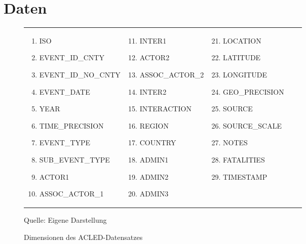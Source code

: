 \documentclass[usegeometry=true]{scrartcl}
\begin{document}
\section{Daten} \label{sec:daten}

\begin{figure}[]
\begin{center}

\begin{tabular}{lllll}
 \parbox{5.5cm}{
 \begin{enumerate}
  \item ISO
  \item EVENT\_ID\_CNTY
  \item EVENT\_ID\_NO\_CNTY
  \item EVENT\_DATE
  \item YEAR
  \item TIME\_PRECISION
  \item EVENT\_TYPE
  \item SUB\_EVENT\_TYPE
  \item ACTOR1
  \item ASSOC\_ACTOR\_1
 \end{enumerate}}
 &
 \parbox{4.5cm}{
 \begin{enumerate}
 \setcounter{enumi}{10}
  \item INTER1
  \item ACTOR2
  \item ASSOC\_ACTOR\_2
  \item INTER2
  \item INTERACTION
  \item REGION
  \item COUNTRY
  \item ADMIN1
  \item ADMIN2
  \item ADMIN3
 \end{enumerate}}
 &
 \parbox{5cm}{
 \begin{enumerate}
 \setcounter{enumi}{20}
  \item LOCATION
  \item LATITUDE
  \item LONGITUDE
  \item GEO\_PRECISION
  \item SOURCE
  \item SOURCE\_SCALE
  \item NOTES
  \item FATALITIES
  \item TIMESTAMP
 \end{enumerate}}

\end{tabular}

\caption{Dimensionen des ACLED-Datensatzes}
Quelle: Eigene Darstellung
\label{dimensions}
\end{center}
\end{figure}
\end{document}
